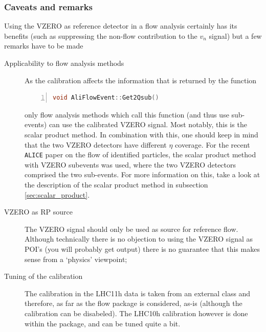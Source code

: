 \documentclass[a4paper]{book}
\numberwithin{equation}{subsection}
\begin{document}
\subsubsection{Caveats and remarks}
Using the VZERO as reference detector in a flow analysis certainly has its benefits (such as suppressing the non-flow contribution to the $v_n$ signal) but a few remarks have to be made
\begin{description}
\item[Applicability to flow analysis methods] As the calibration affects the information that is returned by the function
\begin{lstlisting}[language=C, numbers=left]
void AliFlowEvent::Get2Qsub()\end{lstlisting}
only flow analysis methods which call this function (and thus use sub-events) can use the calibrated VZERO signal. Most notably, this is the scalar product method. In combination with this, one should keep in mind that the two VZERO detectors have different $\eta$ coverage. For the recent \texttt{ALICE} paper on the flow of identified particles, the scalar product method with VZERO subevents was used, where the two VZERO detectors comprised the two sub-events. For more information on this, take a look at the description of the scalar product method in subsection \ref{sec:scalar_product}. 
\item[VZERO as RP source] The VZERO signal should only be used as source for reference flow. Although technically there is no objection to using the VZERO signal as POI's (you will probably get output) there is no guarantee that this makes sense from a `physics' viewpoint;
\item[Tuning of the calibration] The calibration in the LHC11h data is taken from an external class and therefore, as far as the flow package is considered, as-is (although the calibration can be disabeled). The LHC10h calibration however is done within the package, and can be tuned quite a bit. 


\end{description}
\end{document}
